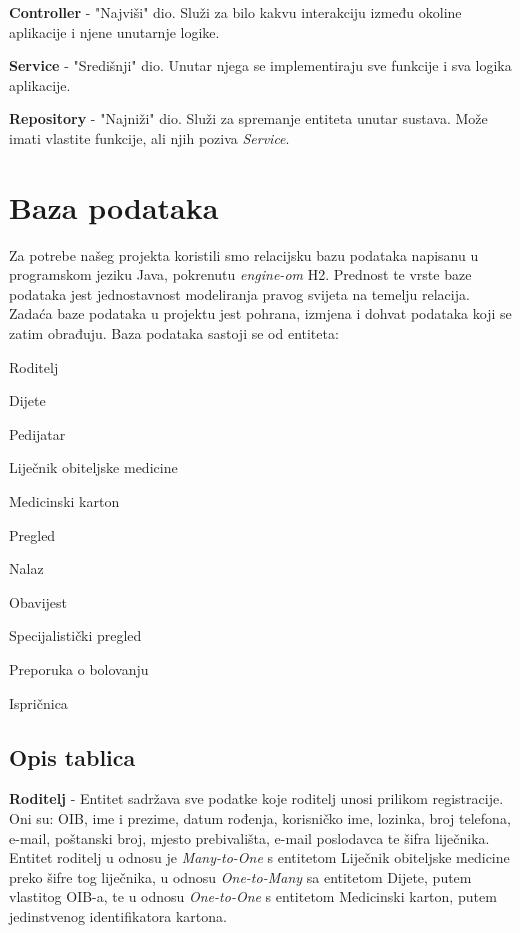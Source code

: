 		\begin{packed_item}
			\item \textbf{Controller} - "Najviši" dio. Služi za bilo kakvu interakciju između okoline aplikacije i njene unutarnje logike.
			\item \textbf{Service} - "Središnji" dio. Unutar njega se implementiraju sve funkcije i sva logika aplikacije. 
			\item \textbf{Repository} - "Najniži" dio. Služi za spremanje entiteta unutar sustava. Može imati vlastite funkcije, ali njih poziva \textit{Service}. 
		\end{packed_item}
		\clearpage
		
		
		

				
		\section{Baza podataka}
			
			\text Za potrebe našeg projekta koristili smo relacijsku bazu podataka napisanu u programskom jeziku Java, pokrenutu \textit{engine-om} H2. Prednost te vrste baze podataka jest jednostavnost modeliranja pravog svijeta na temelju relacija. Zadaća baze podataka u projektu jest pohrana, izmjena i dohvat podataka koji se zatim obrađuju. Baza podataka sastoji se od entiteta:
			\begin{packed_item}
				\item Roditelj
				\item Dijete
				\item Pedijatar
				\item Liječnik obiteljske medicine
				\item Medicinski karton
				\item Pregled
				\item Nalaz
				\item Obavijest
				\item Specijalistički pregled
				\item Preporuka o bolovanju
				\item Ispričnica
			\end{packed_item}
		
			\subsection{Opis tablica}
			

				\textbf{Roditelj} - Entitet sadržava sve podatke koje roditelj unosi prilikom registracije. Oni su: OIB, ime i prezime, datum rođenja, korisničko ime, lozinka, broj telefona, e-mail, poštanski broj, mjesto prebivališta, e-mail poslodavca te šifra liječnika. Entitet roditelj u odnosu je \textit{Many-to-One} s entitetom Liječnik obiteljske medicine preko šifre tog liječnika, u odnosu \textit{One-to-Many} sa entitetom Dijete, putem vlastitog OIB-a, te u odnosu \textit{One-to-One} s entitetom Medicinski karton, putem jedinstvenog identifikatora kartona.
				
